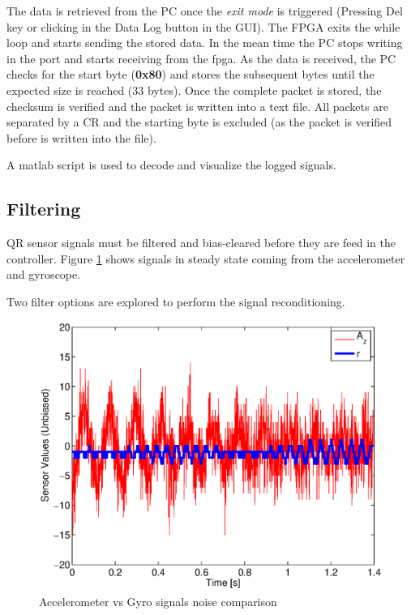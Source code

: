 \documentclass{article}
\begin{document}
The data is retrieved from the PC once the \emph{exit mode} is triggered (Pressing Del key or clicking in the Data Log button in the GUI). The FPGA exits the while loop and starts sending the stored data. In the mean time the PC stops writing in the port and starts receiving from the fpga. As the data is received, the PC checks for the start byte (\textbf{0x80}) and stores the subsequent bytes until the expected size is reached (33 bytes). Once the complete packet is stored, the checksum is verified and the packet is written into a text file. All packets are separated by a CR and the starting byte is excluded (as the packet is verified before is written into the file).

A matlab script is used to decode and visualize the logged signals.


\subsection{Filtering}

QR sensor signals must be filtered and bias-cleared before they are feed in the controller. Figure \ref{fig.Noise} shows signals in steady state coming from the accelerometer and gyroscope.

Two filter options are explored to perform the signal reconditioning.

\begin{figure}[ht]
\centering
	\includegraphics[scale=0.6]{Figures/Noise.eps}
	\caption{Accelerometer vs Gyro signals noise comparison}
	\label{fig.Noise}
\end{figure}
\end{document}
